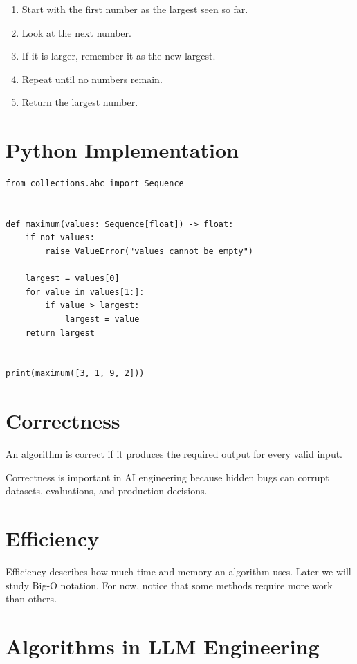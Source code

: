 \begin{enumerate}
    \item Start with the first number as the largest seen so far.
    \item Look at the next number.
    \item If it is larger, remember it as the new largest.
    \item Repeat until no numbers remain.
    \item Return the largest number.
\end{enumerate}

\section{Python Implementation}

\begin{lstlisting}
from collections.abc import Sequence


def maximum(values: Sequence[float]) -> float:
    if not values:
        raise ValueError("values cannot be empty")

    largest = values[0]
    for value in values[1:]:
        if value > largest:
            largest = value
    return largest


print(maximum([3, 1, 9, 2]))
\end{lstlisting}

\section{Correctness}

An algorithm is correct if it produces the required output for every valid input.

Correctness is important in AI engineering because hidden bugs can corrupt datasets, evaluations, and production decisions.

\section{Efficiency}

Efficiency describes how much time and memory an algorithm uses. Later we will study Big-O notation. For now, notice that some methods require more work than others.

\section{Algorithms in LLM Engineering}

